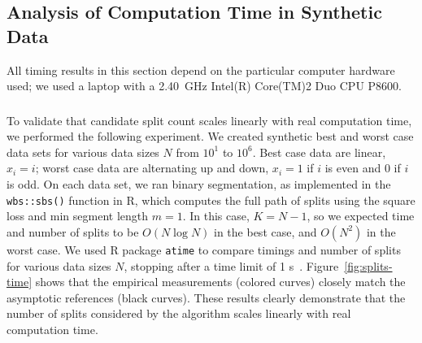 \documentclass[algorithms,article,accept,oneauthor]{Definitions/mdpi}
\begin{document}

{\subsection{Analysis of Computation Time in Synthetic Data}
All timing results in this section depend on the particular computer hardware used; we used a laptop with a 2.40~GHz Intel(R) Core(TM)2 Duo CPU P8600.

\subsubsection{}
To validate that candidate split count scales linearly with real computation time, we performed the following experiment.
We created synthetic best and worst case data sets for various data sizes $N$ from $10^1$ to $10^6$.
Best case data are linear, $x_i=i$; worst case data are alternating up and down, $x_i=1$ if $i$ is even and 0 if $i$ is odd.
On each data set, we ran binary segmentation, as implemented in the \texttt{wbs::sbs()} function in R, which computes the full path of splits using the square loss and min segment length $m=1$.
In this case, $K=N-1$, so we expected time and number of splits to be $O(N\log N)$ in the best case, and $O(N^2)$ in the worst case.
We used R package \texttt{atime} to compare timings and number of splits for various data sizes $N$, stopping after a time limit of 1 s~\citep{Amoakohene2026atime}.
Figure~\ref{fig:splits-time} shows that the empirical measurements (colored curves) closely match the asymptotic references (black curves).
These results clearly demonstrate that the number of splits considered by the algorithm scales linearly with real computation time.


}
\end{document}
